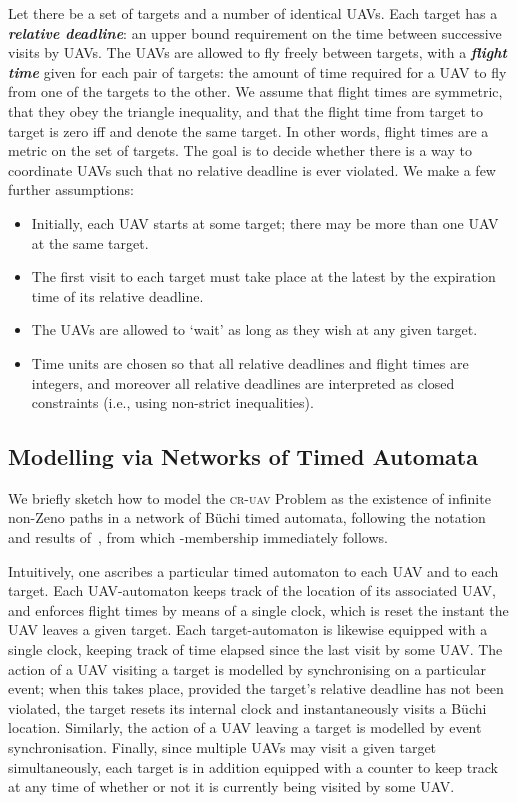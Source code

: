 \documentclass[envcountsame]{llncs}
\begin{document}
Let there be a set of targets and a number of identical UAVs.  Each
target has a \emph{\textbf{relative deadline}}: an upper bound
requirement on the time between successive visits by UAVs.  The UAVs
are allowed to fly freely between targets, with a \emph{\textbf{flight
    time}} given for each pair of targets: the amount of time
required for a UAV to fly from one of the targets to the other. We
assume that flight times are symmetric, that they obey the triangle
inequality, and that the flight time from target  to target  is
zero iff  and  denote the same target. In other words, flight
times are a metric on the set of targets. The goal is to decide
whether there is a way to coordinate UAVs such that no relative
deadline is ever violated. We make a few further assumptions:
\begin{itemize}
\item Initially, each UAV starts at some target; there may be more
  than one UAV at the same target.
\item The first visit to each target must take place at the latest by
  the expiration time of its relative deadline.
\item The UAVs are allowed to `wait' as long as they wish at any given
  target. 
\item Time units are chosen so that all relative deadlines and flight
  times are integers, and moreover all relative deadlines are
  interpreted as closed constraints (i.e., using non-strict inequalities).
\end{itemize}


\subsection{Modelling via Networks of Timed Automata}\label{subsec:membership}

We briefly sketch how to model the \textsc{cr-uav} Problem as the
existence of infinite non-Zeno paths in a network of B\"uchi timed
automata, following the notation and results of~\cite{Alur1998}, from
which -membership immediately follows.

Intuitively, one ascribes a particular timed automaton to each UAV and
to each target. Each UAV-automaton keeps track of the location of its
associated UAV, and enforces flight times by means of a single clock,
which is reset the instant the UAV leaves a given target. Each
target-automaton is likewise equipped with a single clock, keeping
track of time elapsed since the last visit by some UAV\@. The action
of a UAV visiting a target is modelled by synchronising on a
particular event; when this takes place, provided the target's
relative deadline has not been violated, the target resets its
internal clock and instantaneously visits a B\"uchi
location. Similarly, the action of a UAV leaving a target is modelled
by event synchronisation. Finally, since multiple UAVs may visit a
given target simultaneously, each target is in addition equipped with
a counter to keep track at any time of whether or not it is currently
being visited by some UAV.
\end{document}
